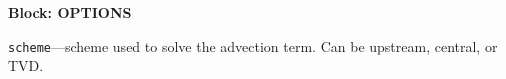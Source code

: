 
\item \textbf{Block: OPTIONS}

\begin{description}
\item \texttt{scheme}---scheme used to solve the advection term.  Can be upstream, central, or TVD.

\end{description}

